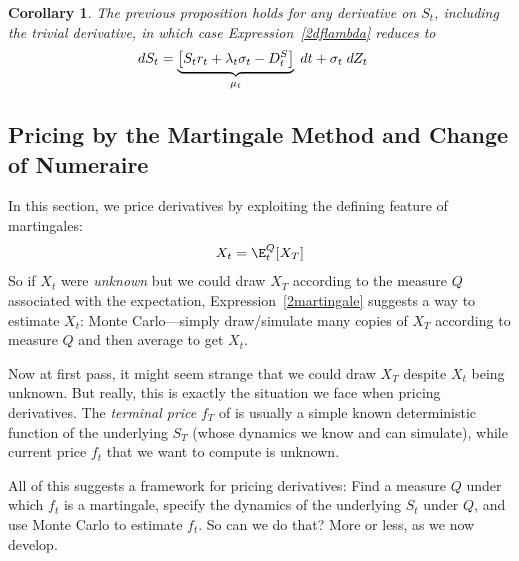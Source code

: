 \documentclass[12pt]{article}
\theoremstyle{plain}
\newtheorem{cor}[thm]{Corollary}
\theoremstyle{definition}
\theoremstyle{remark}
\begin{document}
\begin{cor}
\label{2cor:dSlambda}
The previous proposition holds for \emph{any} derivative on $S_t$,
including the trivial derivative, in which case
Expression~\ref{2dflambda} reduces to
\begin{align*}
  dS_{t}
  &=
  \underbrace{%
    \left[
    S_tr_t+\lambda_t\sigma_{t}
    -D_{t}^S
    \right]
  }_{\mu_t}
  \; dt
  +
  \sigma_t
  \;dZ_t
\end{align*}
\end{cor}


\clearpage
\subsection{Pricing by the Martingale Method and Change of Numeraire}

In this section, we price derivatives by exploiting the defining feature
of martingales:
\begin{align}
  X_t = \E_t^Q[X_T]
  \label{2martingale}
\end{align}
So if $X_t$ were \emph{unknown} but we could draw $X_T$ according to the
measure $Q$ associated with the expectation, Expression~\ref{2martingale}
suggests a way to estimate $X_t$: Monte Carlo---simply draw/simulate
many copies of $X_T$ according to measure $Q$ and then average to get
$X_t$.

Now at first pass, it might seem strange that we could draw $X_T$
despite $X_t$ being unknown. But really, this is exactly the situation
we face when pricing derivatives.  The \emph{terminal price} $f_T$ of is
usually a simple known deterministic function of the underlying $S_T$
(whose dynamics we know and can simulate), while current price $f_t$
that we want to compute is unknown.

All of this suggests a framework for pricing derivatives:
Find a measure $Q$ under which $f_t$ is a martingale, specify the
dynamics of the underlying $S_t$ under $Q$, and use Monte Carlo to
estimate $f_t$. So can we do that?
More or less, as we now develop.
\end{document}
